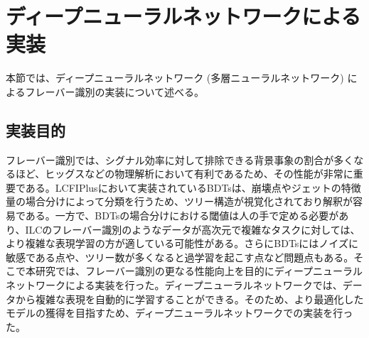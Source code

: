 \section{ディープニューラルネットワークによる実装}
本節では、ディープニューラルネットワーク (多層ニューラルネットワーク) によるフレーバー識別の実装について述べる。
\subsection{実装目的}
フレーバー識別では、シグナル効率に対して排除できる背景事象の割合が多くなるほど、ヒッグスなどの物理解析において有利であるため、その性能が非常に重要である。LCFIPlusにおいて実装されているBDTsは、崩壊点やジェットの特徴量の場合分けによって分類を行うため、ツリー構造が視覚化されており解釈が容易である。一方で、BDTsの場合分けにおける閾値は人の手で定める必要があり、ILCのフレーバー識別のようなデータが高次元で複雑なタスクに対しては、より複雑な表現学習の方が適している可能性がある。さらにBDTsにはノイズに敏感である点や、ツリー数が多くなると過学習を起こす点など問題点もある。そこで本研究では、フレーバー識別の更なる性能向上を目的にディープニューラルネットワークによる実装を行った。ディープニューラルネットワークでは、データから複雑な表現を自動的に学習することができる。そのため、より最適化したモデルの獲得を目指すため、ディープニューラルネットワークでの実装を行った。

